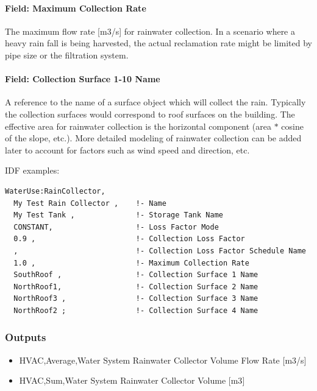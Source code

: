 \paragraph{Field: Maximum Collection Rate}\label{field-maximum-collection-rate}

The maximum flow rate {[}m3/s{]} for rainwater collection. In a scenario where a heavy rain fall is being harvested, the actual reclamation rate might be limited by pipe size or the filtration system.

\paragraph{Field: Collection Surface 1-10 Name}\label{field-collection-surface-1-10-name}

A reference to the name of a surface object which will collect the rain. Typically the collection surfaces would correspond to roof surfaces on the building. The effective area for rainwater collection is the horizontal component (area $*$ cosine of the slope, etc.). More detailed modeling of rainwater collection can be added later to account for factors such as wind speed and direction, etc.

IDF examples:

\begin{lstlisting}
WaterUse:RainCollector,
  My Test Rain Collector ,    !- Name
  My Test Tank ,              !- Storage Tank Name
  CONSTANT,                   !- Loss Factor Mode
  0.9 ,                       !- Collection Loss Factor
  ,                           !- Collection Loss Factor Schedule Name
  1.0 ,                       !- Maximum Collection Rate
  SouthRoof ,                 !- Collection Surface 1 Name
  NorthRoof1,                 !- Collection Surface 2 Name
  NorthRoof3 ,                !- Collection Surface 3 Name
  NorthRoof2 ;                !- Collection Surface 4 Name
\end{lstlisting}

\subsubsection{Outputs}\label{outputs-3-023}

\begin{itemize}
\item
  HVAC,Average,Water System Rainwater Collector Volume Flow Rate {[}m3/s{]}
\item
  HVAC,Sum,Water System Rainwater Collector Volume {[}m3{]}
\end{itemize}

